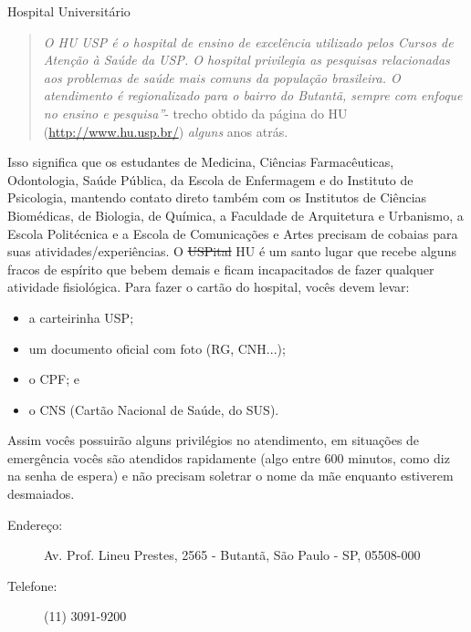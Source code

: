 \begin{secao}{Hospital Universitário}
   \begin{quote}\emph{O HU USP é o hospital de ensino de excelência utilizado
pelos Cursos de Atenção à Saúde da USP.  O hospital privilegia as pesquisas
relacionadas aos problemas de saúde  mais comuns da população brasileira. O
atendimento é regionalizado para o bairro do Butantã, sempre com enfoque no
ensino e pesquisa''}- trecho obtido da página do HU (\url{http://www.hu.usp.br/})
\textit{alguns} anos atrás.
   \end{quote}

Isso significa que os estudantes de Medicina, Ciências Farmacêuticas,
Odontologia, Saúde Pública, da Escola de Enfermagem e do Instituto de
Psicologia, mantendo contato direto também com os Institutos de Ciências
Biomédicas, de Biologia, de Química, a Faculdade de Arquitetura e Urbanismo,
a Escola Politécnica e a Escola de Comunicações e Artes precisam de cobaias para
suas atividades/experiências. O \sout{USPital} HU é um santo lugar que recebe alguns 
fracos de espírito que bebem demais e ficam incapacitados de fazer qualquer 
atividade fisiológica. Para fazer o cartão do hospital, vocês devem levar:

\begin{itemize}
   \item a carteirinha USP;
   \item um documento oficial com foto (RG, CNH...);
   \item o CPF; e
   \item o CNS (Cartão Nacional de Saúde, do SUS).
\end{itemize}

Assim vocês possuirão alguns privilégios no atendimento, em situações de
emergência vocês são atendidos rapidamente (algo entre 600 minutos, como
diz na senha de espera) e não precisam soletrar o nome da mãe enquanto
estiverem desmaiados.

\begin{description}
\item [Endereço:] Av. Prof. Lineu Prestes, 2565 - Butantã, São Paulo - SP, 05508-000
\item [Telefone:] (11) 3091-9200
\end{description}

\end{secao}

